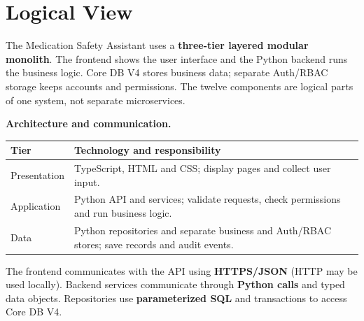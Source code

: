 %

\section{Logical View}
\label{sec:logical-view}

The Medication Safety Assistant uses a \textbf{three-tier layered modular monolith}.
The frontend shows the user interface and the Python backend runs the business logic.
Core DB V4 stores business data; separate Auth/RBAC storage keeps accounts and
permissions. The twelve components are logical parts of one system, not separate
microservices.

\noindent\textbf{Architecture and communication.}\par\smallskip
\begingroup\small
\begin{tabularx}{\textwidth}{|L{0.24\textwidth}|Y|}
\hline
\textbf{Tier} & \textbf{Technology and responsibility} \\ \hline
Presentation & TypeScript, HTML and CSS; display pages and collect user input. \\ \hline
Application & Python API and services; validate requests, check permissions and run business logic. \\ \hline
Data & Python repositories and separate business and Auth/RBAC stores; save records and audit events. \\ \hline
\end{tabularx}
\endgroup

The frontend communicates with the API using \textbf{HTTPS/JSON} (HTTP may be
used locally). Backend services communicate through \textbf{Python calls}
and typed data objects. Repositories use \textbf{parameterized SQL} and
transactions to access Core DB V4.

